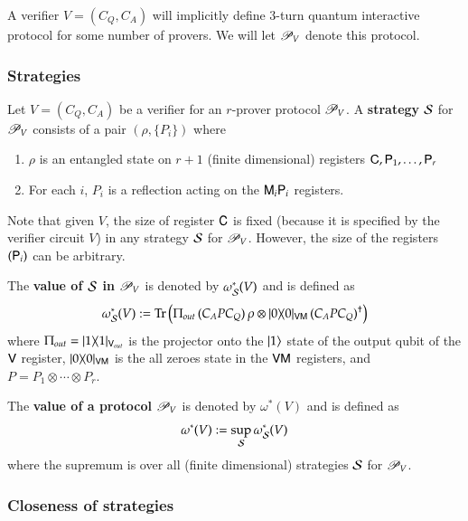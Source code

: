 A verifier $V = (C_Q,C_A)$ will implicitly define $3$-turn quantum interactive protocol for some number of provers. We will let $\mathscr{P}_V$ denote this protocol.

\subsubsection{Strategies}

Let $V = (C_Q,C_A)$ be a verifier for an $r$-prover protocol $\mathscr{P}_V$. A \textbf{strategy} $\mathcal{S}$ for $\mathscr{P}_V$ consists of a pair $(\rho,\{P_i\})$ where
\begin{enumerate}
	\item $\rho$ is an entangled state on $r+1$ (finite dimensional) registers ${\mathsf{C}}, {\mathsf{P}}_1, \ldots, {\mathsf{P}}_r$
	\item For each $i$, $P_i$ is a reflection acting on the ${\mathsf{M}}_i {\mathsf{P}}_i$ registers.
\end{enumerate}
Note that given $V$, the size of register ${\mathsf{C}}$ is fixed (because it is specified by the verifier circuit $V$) in any strategy $\mathcal{S}$ for $\mathscr{P}_V$. However, the size of the registers $( {\mathsf{P}}_i)$ can be arbitrary.

The \textbf{value of $\mathcal{S}$ in $\mathscr{P}_V$} is denoted by $\omega^*_{\mathcal{S}}(V)$ and is defined as
\[
	\omega^*_{\mathcal{S}}(V) := \operatorname{Tr} \left( \Pi_{out} \, ( C_A P C_Q) \, \rho \otimes |0\rangle\! \langle 0|_{{\mathsf{V}} {\mathsf{M}}} \, (C_A P C_Q)^\dagger\right)
\]
where $\Pi_{out} = |1\rangle\! \langle 1|_{{\mathsf{V}}_{out}}$ is the projector onto the $|1\rangle$ state of the output qubit of the ${\mathsf{V}}$ register, $|0\rangle\! \langle 0|_{{\mathsf{V}} {\mathsf{M}}}$ is the all zeroes state in the ${\mathsf{V}} {\mathsf{M}}$ registers, and $P = P_1 \otimes \cdots \otimes P_r$. 


The \textbf{value of a protocol $\mathscr{P}_V$} is denoted by $\omega^*(V)$ and is defined as 
\[
	\omega^*(V) := \sup_{\mathcal{S}} \omega^*_{\mathcal{S}}(V)
\]
where the supremum is over all (finite dimensional) strategies $\mathcal{S}$ for $\mathscr{P}_V$. 



\subsubsection{Closeness of strategies} 

